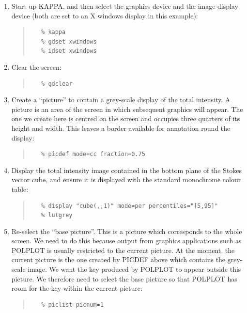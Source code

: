 \documentclass[twoside,11pt]{article}
\renewcommand{\_}{\texttt{\symbol{95}}}
\newenvironment{myquote}{\begin{quote}\begin{small}}{\end{small}\end{quote}}
\begin{document}
\begin{enumerate}
\item \label{STEP:DEVICE} Start up KAPPA, and then select the graphics 
device and the image display device (both are set to an X windows display 
in this example):
\begin{myquote}
\begin{verbatim}
   % kappa
   % gdset xwindows
   % idset xwindows
\end{verbatim}
\end{myquote}

\item Clear the screen:
\begin{myquote}
\begin{verbatim}
   % gdclear
\end{verbatim}
\end{myquote}

\item \label{STEP:PICDEF} Create a ``picture'' to contain a grey-scale display of the total
intensity. A picture is an area of the screen in which subsequent graphics
will appear. The one we create here is centred on the screen and occupies
three quarters of its height and width. This leaves a border available
for annotation round the display:
\begin{myquote}
\begin{verbatim}
   % picdef mode=cc fraction=0.75
\end{verbatim}
\end{myquote}

\item \label{STEP:DISPLAY} Display the total intensity image contained in the bottom plane of 
the Stokes vector cube, and ensure it is displayed with the standard 
monochrome colour table:
\begin{myquote}
\begin{verbatim}
   % display "cube(,,1)" mode=per percentiles="[5,95]"
   % lutgrey
\end{verbatim}
\end{myquote}

\item \label{STEP:PICLIST} Re-select the ``base picture''. This is a
picture which corresponds to the whole screen. We need to do this because
output from graphics applications such as POLPLOT is usually restricted
to the current picture. At the moment, the current picture is the one
created by PICDEF above which contains the grey-scale image. We want the
key produced by POLPLOT to appear outside this picture. We therefore need
to select the base picture so that POLPLOT has room for the key within
the current picture:
\begin{myquote}
\begin{verbatim}
   % piclist picnum=1
\end{verbatim}
\end{myquote}


\end{enumerate}
\end{document}
